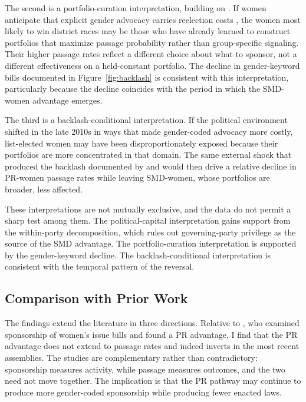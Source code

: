 \documentclass[11pt]{article}
\begin{document}
The second is a portfolio-curation interpretation, building on \citet{bailerEtAl2021}. If women anticipate that explicit gender advocacy carries reelection costs \citep{shim2021b}, the women most likely to win district races may be those who have already learned to construct portfolios that maximize passage probability rather than group-specific signaling. Their higher passage rates reflect a different choice about what to sponsor, not a different effectiveness on a held-constant portfolio. The decline in gender-keyword bills documented in Figure~\ref{fig:backlash} is consistent with this interpretation, particularly because the decline coincides with the period in which the SMD-women advantage emerges.

The third is a backlash-conditional interpretation. If the political environment shifted in the late 2010s in ways that made gender-coded advocacy more costly, list-elected women may have been disproportionately exposed because their portfolios are more concentrated in that domain. The same external shock that produced the backlash documented by \citet{woo2023} and \citet{kimLeeKang2025} would then drive a relative decline in PR-women passage rates while leaving SMD-women, whose portfolios are broader, less affected.

These interpretations are not mutually exclusive, and the data do not permit a sharp test among them. The political-capital interpretation gains support from the within-party decomposition, which rules out governing-party privilege as the source of the SMD advantage. The portfolio-curation interpretation is supported by the gender-keyword decline. The backlash-conditional interpretation is consistent with the temporal pattern of the reversal.

\subsection{Comparison with Prior Work}

The findings extend the literature in three directions. Relative to \citet{kweonRyan2021}, who examined sponsorship of women's issue bills and found a PR advantage, I find that the PR advantage does not extend to passage rates and indeed inverts in the most recent assemblies. The studies are complementary rather than contradictory: sponsorship measures activity, while passage measures outcomes, and the two need not move together. The implication is that the PR pathway may continue to produce more gender-coded sponsorship while producing fewer enacted laws.
\end{document}
